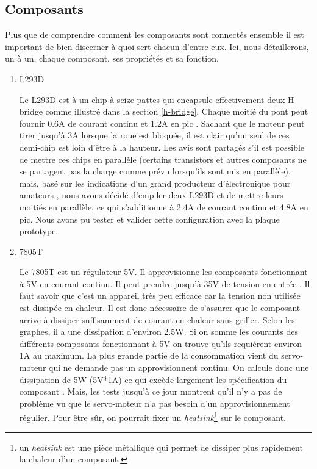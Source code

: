 \documentclass[a4paper,11pt]{report}
\begin{document}
{\begin{enumerate}
\begin{enumerate}
\subsection{Composants}

Plus que de comprendre comment les composants sont connectés ensemble il est important de bien discerner à quoi sert chacun d'entre eux. Ici, nous détaillerons, un à un, chaque composant, ses propriétés et sa fonction.


\begin{enumerate}
\item L293D

Le L293D est à un chip à seize pattes qui encapsule effectivement deux H-bridge comme illustré dans la section \ref{h-bridge}. Chaque moitié du pont peut fournir 0.6A de courant continu et 1.2A en pic \cite{l293dDataSheet}. Sachant que le moteur peut tirer jusqu'à 3A lorsque la roue est bloquée, il est clair qu'un seul de ces demi-chip est loin d'être à la hauteur. Les avis sont partagés s'il est possible de mettre ces chips en parallèle (certains transistors et autres composants ne se partagent pas la charge comme prévu lorsqu'ils sont mis en parallèle), mais, basé sur les indications d'un grand producteur d'électronique pour amateurs \cite{adafruitMotorShield}, nous avons décidé d'empiler deux L293D et de mettre leurs moitiés en parallèle, ce qui s'additionne à 2.4A de courant continu et 4.8A en pic. Nous avons pu tester et valider cette configuration avec la plaque prototype. 

\item 7805T

Le 7805T est un régulateur 5V. Il approvisionne les composants fonctionnant à 5V en courant continu. Il peut prendre jusqu'à 35V de tension en entrée \cite{7805T}. Il faut savoir que c'est un appareil très peu efficace car la tension non utilisée est dissipée en chaleur. Il est donc nécessaire de s'assurer que le composant arrive à dissiper suffisamment de courant en chaleur sans griller. Selon les graphes, il a une dissipation d'environ 2.5W. Si on somme les courants des différents composants fonctionnant à 5V on trouve qu'ils requièrent environ 1A au maximum. La plus grande partie de la consommation vient du servo-moteur qui ne demande pas un approvisionnent continu. On calcule donc une dissipation de 5W (5V*1A) ce qui excède largement les spécification du composant \cite{7805T}. Mais, les tests jusqu'à ce jour montrent qu'il n'y a pas de problème vu que le servo-moteur n'a pas besoin d'un approvisionnement régulier. Pour être sûr, on pourrait fixer un \textit{heatsink}\footnote{un \textit{heatsink} est une pièce métallique qui permet de dissiper plus rapidement la chaleur d'un composant.} sur le composant.


\end{enumerate}
\end{enumerate}
\end{enumerate}}
\end{document}
